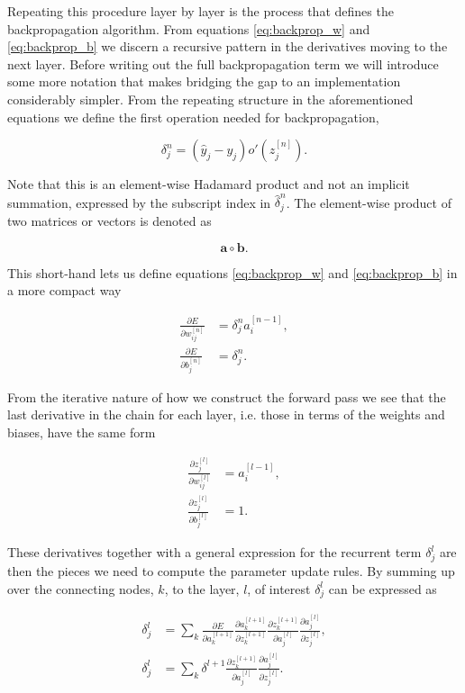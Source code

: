 \noindent Repeating this procedure layer by layer is the process that defines the backpropagation algorithm. From equations \ref{eq:backprop_w} and \ref{eq:backprop_b} we discern a recursive pattern in the derivatives moving to the next layer. Before writing out the full backpropagation term we will introduce some more notation that makes bridging the gap to an implementation considerably simpler. From the repeating structure in the aforementioned equations we define the first operation needed for backpropagation,

\begin{equation}
\delta^n_j = (\hat{y}_j - y_j)o'(z_j^{[n]}).
\end{equation}

\noindent Note that this is an element-wise Hadamard product and not an implicit summation, expressed by the subscript index in $\hat{\delta}^n_j$.
The element-wise product of two matrices or vectors is denoted as  

\begin{equation}
\mathbf{a} \circ \mathbf{b}.
\end{equation}

\noindent This short-hand lets us define equations \ref{eq:backprop_w} and \ref{eq:backprop_b} in a more compact way

\begin{align}
\frac{\partial E}{\partial w_{ij}^{[n]}} &= \delta^n_j a^{[n-1]}_i,\\
\frac{\partial E}{\partial b_{j}^{[n]}} &= \delta^n_j.
\end{align} 

\noindent From the iterative nature of how we construct the forward pass we see that the last derivative in the chain for each layer, i.e. those in terms of the weights and biases, have the same form 

\begin{align}
\frac{\partial z_j^{[l]}}{\partial w_{ij}^{[l]}} &= a^{[l-1]}_i, \\
\frac{\partial z_j^{[l]}}{\partial b_{j}^{[l]}} &= 1.
\end{align}

\noindent These derivatives together with a general expression for the recurrent term $\delta^l_j$ are then the pieces we need to compute the parameter update rules. By summing up over the connecting nodes, $k$, to the layer, $l$, of interest $\delta_j^l$ can be expressed as

\begin{align}
\delta_j^l &= 
\sum_k \frac{\partial E}{\partial a_k^{[l+1]}} 
\frac{\partial a_k^{[l+1]}}{\partial z_k^{[l+1]}} 
\frac{\partial z_k^{[l+1]}}{\partial a_j^{[l]}} 
\frac{\partial a_j^{[l]}}{\partial z_j^{[l]}},\\
\delta_j^l &= 
\sum_k \delta^{l+1} \frac{\partial z_k^{[l+1]}}{\partial a_j^{[l]}} 
\frac{\partial a_j^{[l]}}{\partial z_j^{[l]}} \label{eq:penult_dl}.
\end{align}

